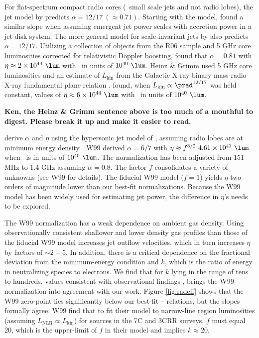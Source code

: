 \documentclass{emulateapj}
\begin{document}
For flat-spectrum compact radio cores (\eg\ small scale jets and not
radio lobes), the jet model by \citet{1979ApJ...232...34B} predicts
$\alpha = 12/17~(\approx 0.71)$. Starting with the
\citet{1979ApJ...232...34B} model, \citet{1995A&A...293..665F} found a
similar slope when assuming emergent jet power scales with accretion
power in a jet-disk system. The more general model for
scale-invariant jets by \citet{2003MNRAS.343L..59H} also predicts
$\alpha = 12/17$. Utilizing a collection of objects from the R06
sample and 5 GHz core luminosities corrected for relativistic Doppler
boosting, \citet{2007MNRAS.381..589M} found that $\alpha = 0.81$ with
$\eta \approx 2\times10^{44} ~\lum$ with \prad\ in units of $10^{40}
~\lum$.   Heinz \& Grimm  \citet{2005ApJ...633..384H} used 5 GHz core
luminosities and an estimate of $L_{\mathrm{kin}}$ from the Galactic
X-ray binary mass-radio-X-ray fundamental plane relation
\citep{2003MNRAS.344...60G,
2003MNRAS.345.1057M}. \citet{2005ApJ...633..384H} found, when
$L_{\mathrm{kin}} \propto \prad^{12/17}$ was held constant, values of
$\eta \approx 6\times10^{44} ~\lum$ with \prad\ in units of $10^{40}
~\lum$.

{\bf Ken, the Heinz & Grimm sentence above is too much of a mouthful
to digest.  Please break it up and make it easier to read.}

\citet[][hereafter W99]{1999MNRAS.309.1017W} derive $\alpha$ and
$\eta$ using the hypersonic jet model of \citet{1991MNRAS.250..581F},
assuming radio lobes are at minimum energy density \citep[see][for
details]{1980ARA&A..18..165M}. W99 derived $\alpha = 6/7$ with $\eta
\approx f^{3/2}~4.61\times10^{41} ~\lum$ when \prad\ is in units of
$10^{40} ~\lum$. The normalization has been adjusted from 151 MHz to
1.4 GHz assuming $\alpha = 0.8$. The factor $f$ consolidates a variety
of unknowns (see W99 for details). The fiducial W99 model ($f=1$)
yields $\eta$ two orders of magnitude lower than our best-fit
normalizations. Because the W99 model has been widely used for
estimating jet power, the difference in $\eta$'s needs to be explored.

The W99 normalization has a weak dependence on ambient gas density.
Using observationally consistent shallower and lower density gas
profiles than those of the fiducial W99 model increases jet outflow
velocities, which in turn increases $\eta$ by factors of $\sim
2-5$. In addition, there is a critical dependence on the fractional
deviation from the minimum-energy condition and $k$, which is the
ratio of energy in neutralizing species to electrons. We find that for
$k$ lying in the range of tens to hundreds, values consistent with
observational findings \citep{2005MNRAS.364.1343D,
2006MNRAS.372.1741D, 2006ApJ...648..200D, birzan08}, brings the W99
normalization into agreement with our work. Figure \ref{fig:radeff}
shows that the W99 zero-point lies significantly below our best-fit
\pjet-\prad\ relations, but the slopes formally agree. W99 find that
to fit their model to narrow-line region luminosities (assuming
$L_{\mathrm{NLR}} \propto L_{\mathrm{kin}}$) for sources in the 7C and
3CRR surveys, $f$ must equal 20, which is the upper-limit of $f$ in
their model and implies $k \approx 20$.
\end{document}
